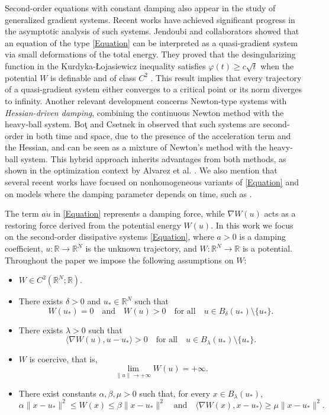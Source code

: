\documentclass[12pt]{amsart}
\numberwithin{equation}{section}
\begin{document}
Second-order equations with constant damping also appear in the study of generalized gradient systems. Recent works have achieved significant progress in the asymptotic analysis of such systems. Jendoubi and collaborators showed that an equation of the type \eqref{Equation} can be interpreted as a quasi-gradient system via small deformations of the total energy. They proved that the desingularizing function in the Kurdyka-Łojasiewicz inequality satisfies $\varphi(t) \ge c\sqrt{t}$ when the potential $W$ is definable and of class $C^2$ \cite{Jendoubi1}. This result implies that every trajectory of a quasi-gradient system either converges to a critical point or its norm diverges to infinity. Another relevant development concerns Newton-type systems with {\it Hessian-driven damping}, combining the continuous Newton method with the heavy-ball system. Boţ and Csetnek in \cite{BotCsetnek} observed that such systems are second-order in both time and space, due to the presence of the acceleration term and the Hessian, and can be seen as a mixture of Newton’s method with the heavy-ball system. This hybrid approach inherits advantages from both methods, as shown in the optimization context by Alvarez et al. \cite{Alvarez}. We also mention that several recent works have focused on nonhomogeneous variants of \eqref{Equation} and on models where the damping parameter depends on time, such as \cite{1,2,3,4,6,7}.

The term $a\dot{u}$ in \eqref{Equation} represents a damping force, while $\nabla W(u)$ acts as a restoring force derived from the potential energy $W(u)$. In this work we focus on the second-order dissipative systems \eqref{Equation}, where $a > 0$ is a damping coefficient, $u\colon \mathbb{R} \to \mathbb{R}^N$ is the unknown trajectory, and $W\colon \mathbb{R}^N \to \mathbb{R}$ is a potential. Throughout the paper we impose the following assumptions on $W$:
\begin{itemize} 
	\item[\hypertarget{W1}{($W_1$)}] $W\in C^2(\mathbb{R}^N; \mathbb{R})$.
	
	\item[\hypertarget{W2}{($W_2$)}] There exists $\delta > 0$ and $u_* \in \mathbb{R}^{N}$ such that
	$$
	W(u_*) = 0 \quad \text{and} \quad W(u) > 0 \quad \text{for all} \quad u \in B_\delta(u_*) \setminus \{u_*\}.
	$$
	
	\item[\hypertarget{W3}{($W_3$)}] There exists $\lambda > 0$ such that
	$$
	\langle \nabla W(u), u - u_* \rangle > 0 \quad \text{for all} \quad u \in B_\lambda(u_*) \setminus \{u_*\}.
	$$
	
	\item[\hypertarget{W4}{($W_4$)}] $W$ is coercive, that is,
	$$
	\lim_{\|u\| \to +\infty} W(u) = +\infty.
	$$
	
	\item[\hypertarget{W5}{($W_5$)}] There exist constants $\alpha, \beta, \mu > 0$ such that, for every $x \in B_\lambda(u_*)$,
	$$
	\alpha\|x - u_*\|^2 \le W(x) \le \beta\|x - u_*\|^2 \quad \text{and} \quad \langle \nabla W(x), x - u_* \rangle \ge \mu\|x - u_*\|^2.
	$$
\end{itemize}
 
\end{document}
